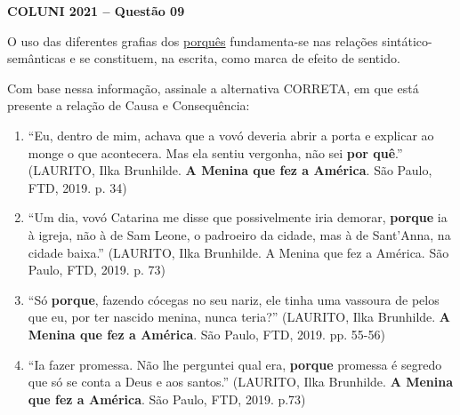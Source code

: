 \textbf{COLUNI 2021 -- Questão 09}\par\medskip O uso das diferentes grafias dos \underline{porquês} fundamenta-se nas relações sintático-semânticas e se constituem, na escrita, como marca de efeito de sentido.

\par

Com base nessa informação, assinale a alternativa CORRETA, em que está presente a relação de Causa e Consequência:\begin{enumerate}
\item “Eu, dentro de mim, achava que a vovó deveria abrir a porta e explicar ao monge o que acontecera. Mas ela
       sentiu vergonha, não sei \textbf{por quê}.” (LAURITO, Ilka Brunhilde. \textbf{A Menina que fez a América}. São Paulo, FTD, 2019. p. 34)
\item “Um dia, vovó Catarina me disse que possivelmente iria demorar, \textbf{porque} ia à igreja, não à de Sam
       Leone, o padroeiro da cidade, mas à de Sant’Anna, na cidade baixa.” (LAURITO, Ilka Brunhilde. A Menina que fez
       a América. São Paulo, FTD, 2019. p. 73)
\item “Só \textbf{porque}, fazendo cócegas no seu nariz, ele tinha uma vassoura de pelos que eu, por ter nascido
       menina, nunca teria?” (LAURITO, Ilka Brunhilde. \textbf{A Menina que fez a América}. São Paulo, FTD, 2019. pp. 55-56)
\item “Ia fazer promessa. Não lhe perguntei qual era, \textbf{porque} promessa é segredo que só se conta a Deus e
       aos santos.” (LAURITO, Ilka Brunhilde. \textbf{A Menina que fez a América}. São Paulo, FTD, 2019. p.73)\end{enumerate}

